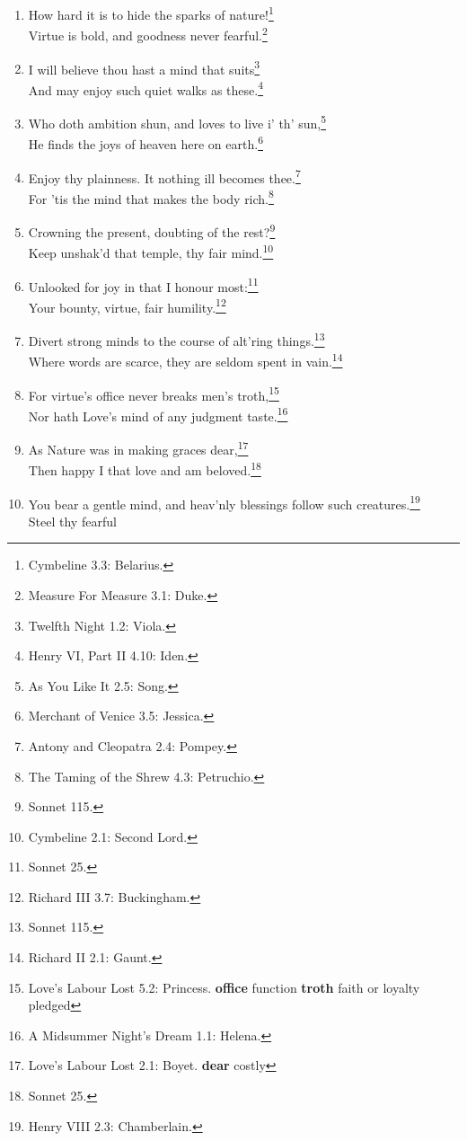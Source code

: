 \documentclass[17pt,twoside]{extarticle}
\begin{document}
\begin{enumerate}
  joy?\footnote{All's Well That Ends Well 2.4: Parolles.}
\item
  How hard it is to hide the sparks of nature!\footnote{Cymbeline 3.3:
    Belarius.}\\Virtue is bold, and goodness never fearful.\footnote{Measure
    For Measure 3.1: Duke.}
\item
  I will believe thou hast a mind that suits\footnote{Twelfth Night 1.2:
    Viola.}\\And may enjoy such quiet walks as these.\footnote{Henry VI,
    Part II 4.10: Iden.}
\item
  Who doth ambition shun, and loves to live i' th' sun,\footnote{As You
    Like It 2.5: Song.}\\He finds the joys of heaven here on
  earth.\footnote{Merchant of Venice 3.5: Jessica.}
\item
  Enjoy thy plainness. It nothing ill becomes thee.\footnote{Antony and
    Cleopatra 2.4: Pompey.}\\For 'tis the mind that makes the body
  rich.\footnote{The Taming of the Shrew 4.3: Petruchio.}
\item
  Crowning the present, doubting of the rest?\footnote{Sonnet 115.}\\Keep
  unshak'd that temple, thy fair mind.\footnote{Cymbeline 2.1: Second
    Lord.}
\item
  Unlooked for joy in that I honour most:\footnote{Sonnet 25.}\\Your
  bounty, virtue, fair humility.\footnote{Richard III 3.7: Buckingham.}
\item
  Divert strong minds to the course of alt'ring things.\footnote{Sonnet
    115.}\\Where words are scarce, they are seldom spent in
  vain.\footnote{Richard II 2.1: Gaunt.}
\item
  For virtue's office never breaks men's troth,\footnote{Love's Labour
    Lost 5.2: Princess. \textbf{office} function \textbf{troth} faith or
    loyalty pledged}\\Nor hath Love's mind of any judgment
  taste.\footnote{A Midsummer Night's Dream 1.1: Helena.}
\item
  As Nature was in making graces dear,\footnote{Love's Labour Lost 2.1:
    Boyet. \textbf{dear} costly}\\Then happy I that love and am
  beloved.\footnote{Sonnet 25.}
\item
  You bear a gentle mind, and heav'nly blessings follow such
  creatures.\footnote{Henry VIII 2.3: Chamberlain.}\\Steel thy fearful

\end{enumerate}
\end{document}
